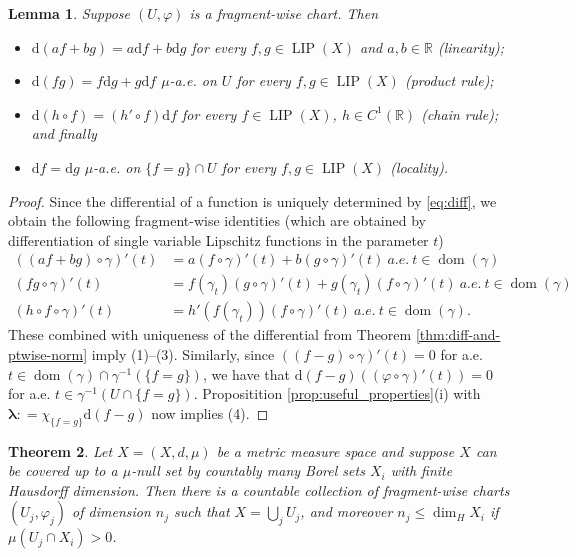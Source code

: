 \documentclass{amsart}
\newtheorem{theorem}{Theorem}[section]
\newtheorem{lemma}[theorem]{Lemma}
\numberwithin{equation}{section}
\newcommand{\R}{\mathbb{R}}
\newcommand{\LIP}{\operatorname{LIP}}
\newcommand{\dom}{\operatorname{dom}}
\newcommand{\ud}{\mathrm {d}}
\newcommand{\inv}{^{-1}}
\newcommand{\defl}{\mathrel{\mathop:}=}
\begin{document}
\begin{lemma}\label{lem:label-diff}
Suppose $(U,\varphi)$ is a fragment-wise chart. Then 
\begin{itemize}
	\item[(1)] $\ud(af+bg)=a\ud f+b\ud g$ for every $f,g\in \LIP(X)$ and $a,b\in \R$ (linearity);
	\item[(2)] $\ud (fg)=f\ud g+g\ud f$ $\mu$-a.e. on $U$ for every $f,g\in \LIP(X)$ (product rule); 
	\item[(3)] $\ud (h\circ f)=(h'\circ f)\ud f$ for every $f\in \LIP(X)$, $h\in C^1(\R)$ (chain rule); and finally 
	\item[(4)] $\ud f=\ud g$ $\mu$-a.e. on $\{f=g\}\cap U$ for every $f,g\in \LIP(X)$ (locality).
\end{itemize}
\end{lemma}
\begin{proof}
Since the differential of a function is uniquely determined by \eqref{eq:diff}, we obtain the following fragment-wise identities (which are obtained by differentiation of single variable Lipschitz functions in the parameter $t$) 
\begin{align*}
	((af+bg)\circ\gamma)'(t)&=a(f\circ\gamma)'(t)+b(g\circ\gamma)'(t)\ a.e.\ t\in \dom(\gamma)\\
	(fg\circ\gamma)'(t)&=f(\gamma_t)(g\circ\gamma)'(t)+g(\gamma_t)(f\circ\gamma)'(t)\ a.e.\ t\in \dom(\gamma)\\
	(h\circ f\circ\gamma)'(t)&=h'(f(\gamma_t))(f\circ\gamma)'(t)\ a.e.\ t\in \dom(\gamma).
\end{align*}
These combined with uniqueness of the differential from Theorem \ref{thm:diff-and-ptwise-norm} imply (1)--(3). Similarly, since $((f-g)\circ\gamma)'(t)=0$ for a.e. $t\in \dom(\gamma)\cap \gamma\inv(\{f=g\})$, we have that $\ud (f-g)((\varphi\circ\gamma)'(t))=0$ for a.e. $t\in \gamma\inv(U\cap \{f=g\})$. Propositition \ref{prop:useful_properties}(i) with $\bm\lambda \defl \chi_{\{f=g\}}\ud(f-g)$ now implies (4).


\end{proof}

\begin{theorem}\label{thm:cover-by-frag-charts}
	Let $X=(X,d,\mu)$ be a metric measure space and suppose $X$ can be covered up to a $\mu$-null set by countably many Borel sets $X_i$ with finite Hausdorff dimension. Then there is a countable collection of fragment-wise charts $(U_j,\varphi_j)$ of dimension $n_j$ such that $X=\bigcup_jU_j$, and moreover $n_j\le \dim_HX_i$ if $\mu(U_j\cap X_i)>0$.
\end{theorem}
\end{document}
